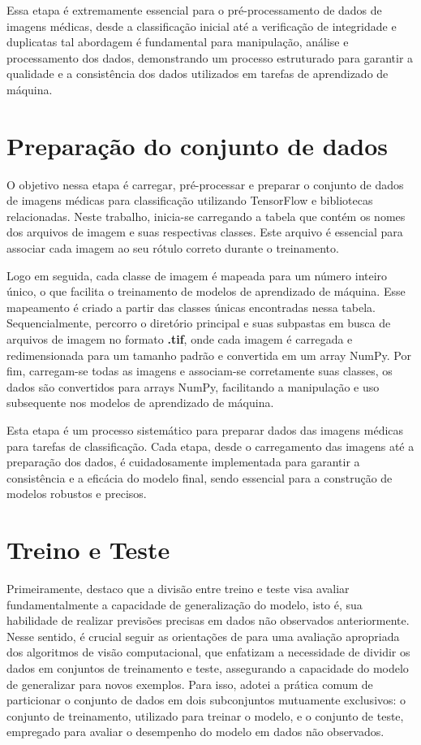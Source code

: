 Essa etapa é extremamente essencial para o pré-processamento de dados de imagens médicas, desde a classificação inicial até a verificação de integridade e duplicatas tal abordagem é fundamental para manipulação, análise e processamento dos dados, demonstrando um processo estruturado para garantir a qualidade e a consistência dos dados utilizados em tarefas de aprendizado de máquina.


\section{Preparação do conjunto de dados}

O objetivo nessa etapa é carregar, pré-processar e preparar o conjunto de dados de imagens médicas para classificação utilizando TensorFlow e bibliotecas relacionadas. Neste trabalho, inicia-se carregando a tabela que contém os nomes dos arquivos de imagem e suas respectivas classes. Este arquivo é essencial para associar cada imagem ao seu rótulo correto durante o treinamento.

Logo em seguida, cada classe de imagem é mapeada para um número inteiro único, o que facilita o treinamento de modelos de aprendizado de máquina. Esse mapeamento é criado a partir das classes únicas encontradas nessa tabela. Sequencialmente, percorro o diretório principal e suas subpastas em busca de arquivos de imagem no formato \textbf{.tif}, onde cada imagem é carregada e redimensionada para um tamanho padrão e convertida em um array NumPy. Por fim, carregam-se todas as imagens e associam-se corretamente suas classes, os dados são convertidos para arrays NumPy, facilitando a manipulação e uso subsequente nos modelos de aprendizado de máquina.

Esta etapa é um processo sistemático para preparar dados das imagens médicas para tarefas de classificação. Cada etapa, desde o carregamento das imagens até a preparação dos dados, é cuidadosamente implementada para garantir a consistência e a eficácia do modelo final, sendo essencial para a construção de modelos robustos e precisos.

\section{Treino e Teste}

Primeiramente, destaco que a divisão entre treino e teste visa avaliar fundamentalmente a capacidade de generalização do modelo, isto é, sua habilidade de realizar previsões precisas em dados não observados anteriormente. Nesse sentido, é crucial seguir as orientações de \cite{matlab} para uma avaliação apropriada dos algoritmos de visão computacional, que enfatizam a necessidade de dividir os dados em conjuntos de treinamento e teste, assegurando a capacidade do modelo de generalizar para novos exemplos. Para isso, adotei a prática comum de particionar o conjunto de dados em dois subconjuntos mutuamente exclusivos: o conjunto de treinamento, utilizado para treinar o modelo, e o conjunto de teste, empregado para avaliar o desempenho do modelo em dados não observados.

